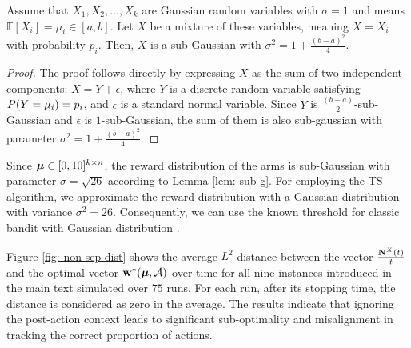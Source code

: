     \begin{lemma}\label{lem: sub-g}
        Assume that $X_1, X_2, \ldots, X_k$ are Gaussian random variables with $\sigma = 1$ and means $\mathbb{E}[X_i] = \mu_i \in [a, b]$. Let $X$ be a mixture of these variables, meaning $X = X_i$ with probability $p_i$. Then, $X$ is a sub-Gaussian with $\sigma^2 = 1 + \frac{(b - a)^2}{4}$.
    \end{lemma}
    \begin{proof}
        The proof follows directly by expressing $X$ as the sum of two independent components: $X = Y + \epsilon$, where $Y$ is a discrete random variable satisfying $P(Y = \mu_i) = p_i$, and $\epsilon$ is a standard normal variable. Since $Y$ is $\frac{(b - a)}{2}$-sub-Gaussian and $\epsilon$ is $1$-sub-Gaussian, the sum of them is also sub-gaussian with parameter $\sigma^2 = 1 + \frac{(b - a)^2}{4}$.
    \end{proof}
    
    Since $\boldsymbol{\mu} \in [0,10]^{k \times n}$, the reward distribution of the arms is sub-Gaussian with parameter $\sigma = \sqrt{26}$ according to Lemma \ref{lem: sub-g}. For employing the TS algorithm, we approximate the reward distribution with a Gaussian distribution with variance $\sigma^2 = 26$. Consequently, we can use the known threshold for classic bandit with Gaussian distribution \cite{kaufmann2021mixture}.
    
    Figure \ref{fig: non-sep-dist} shows the average $L^2$ distance between the vector $\frac{\mathbf{N}^{X}(t)}{t}$ and the optimal vector $\mathbf{w}^*(\boldsymbol{\mu}, \mathcal{A})$ over time for all nine instances introduced in the main text simulated over $75$ runs. For each run, after its stopping time, the distance is considered as zero in the average.  The results indicate that ignoring the post-action context leads to significant sub-optimality and misalignment in tracking the correct proportion of actions. 




